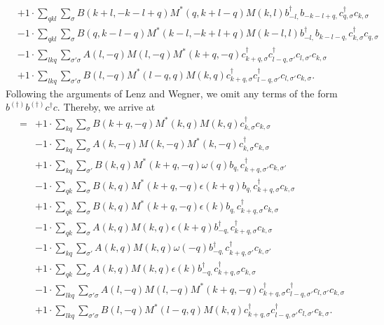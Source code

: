 \begin{align*}
	&+1 \cdot \sum_{ q k l } \sum_{ \sigma } B( k+l, -k-l+q )  M^*( q, k+l-q )  M( k, l )   b_{ -l, }^\dagger  b_{ -k-l+q, } c_{ q, \sigma }^\dagger  c_{ k, \sigma }  \\
	&-1 \cdot \sum_{ q k l } \sum_{ \sigma } B( q, k-l-q )  M^*( k-l, -k+l+q )  M( k-l, l )   b_{ -l, }^\dagger  b_{ k-l-q, } c_{ k, \sigma }^\dagger  c_{ q, \sigma }  \\
	&-1 \cdot \sum_{ l k q } \sum_{ \sigma' \sigma } A( l, -q )  M( l, -q )  M^*( k+q, -q )   c_{ k+q, \sigma }^\dagger  c_{ l-q, \sigma' }^\dagger  c_{ l, \sigma' } c_{ k, \sigma }  \\
	&+1 \cdot \sum_{ l k q } \sum_{ \sigma' \sigma } B( l, -q )  M^*( l-q, q )  M( k, q )   c_{ k+q, \sigma }^\dagger  c_{ l-q, \sigma' }^\dagger  c_{ l, \sigma' } c_{ k, \sigma } 
. \end{align*}
Following the arguments of Lenz and Wegner, we omit any terms of the form $b^{(\dagger)} b^{(\dagger)} c^\dagger c$. Thereby, we arrive at 
\begin{align*}
	[\eta, H] = 	&+1 \cdot \sum_{ k q } \sum_{ \sigma } B( k+q, -q )  M^*( k, q )  M( k, q )   c_{ k, \sigma }^\dagger  c_{ k, \sigma }  \\
	&-1 \cdot \sum_{ k q } \sum_{ \sigma } A( k, -q )  M( k, -q )  M^*( k, -q )   c_{ k, \sigma }^\dagger  c_{ k, \sigma }  \\
	&+1 \cdot \sum_{ k q } \sum_{ \sigma' } B( k, q )  M^*( k+q, -q )  \omega( q )   b_{ q, } c_{ k+q, \sigma' }^\dagger  c_{ k, \sigma' }  \\
	&-1 \cdot \sum_{ q k } \sum_{ \sigma } B( k, q )  M^*( k+q, -q )  \epsilon( k+q )   b_{ q, } c_{ k+q, \sigma }^\dagger  c_{ k, \sigma }  \\
	&+1 \cdot \sum_{ q k } \sum_{ \sigma } B( k, q )  M^*( k+q, -q )  \epsilon( k )   b_{ q, } c_{ k+q, \sigma }^\dagger  c_{ k, \sigma }  \\
	&-1 \cdot \sum_{ q k } \sum_{ \sigma } A( k, q )  M( k, q )  \epsilon( k+q )   b_{ -q, }^\dagger  c_{ k+q, \sigma }^\dagger  c_{ k, \sigma }  \\
	&-1 \cdot \sum_{ k q } \sum_{ \sigma' } A( k, q )  M( k, q )  \omega( -q )   b_{ -q, }^\dagger  c_{ k+q, \sigma' }^\dagger  c_{ k, \sigma' }  \\
	&+1 \cdot \sum_{ q k } \sum_{ \sigma } A( k, q )  M( k, q )  \epsilon( k )   b_{ -q, }^\dagger  c_{ k+q, \sigma }^\dagger  c_{ k, \sigma }  \\
	&-1 \cdot \sum_{ l k q } \sum_{ \sigma' \sigma } A( l, -q )  M( l, -q )  M^*( k+q, -q )   c_{ k+q, \sigma }^\dagger  c_{ l-q, \sigma' }^\dagger  c_{ l, \sigma' } c_{ k, \sigma }  \\
	&+1 \cdot \sum_{ l k q } \sum_{ \sigma' \sigma } B( l, -q )  M^*( l-q, q )  M( k, q )   c_{ k+q, \sigma }^\dagger  c_{ l-q, \sigma' }^\dagger  c_{ l, \sigma' } c_{ k, \sigma } 
. \end{align*}

